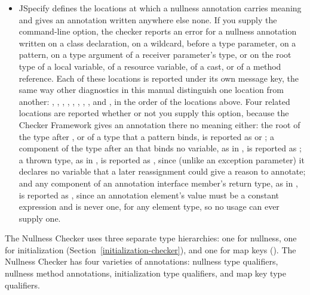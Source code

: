 \begin{enumerate}
\begin{itemize}
\item
  \label{nullness-jspecifyUnrecognizedLocations}%
  JSpecify defines the locations at which a nullness annotation carries meaning
  and gives an annotation written anywhere else none.  If you supply the
   command-line option, the checker reports
  an error for a nullness annotation written on a class declaration, on a wildcard,
  before a type parameter, on a pattern, on a type argument of a receiver parameter's
  type, or on the root type of a local variable, of a resource variable, of a cast, or
  of a method reference.  Each of these locations is reported under its own
   message key, the same way other diagnostics in
  this manual distinguish one location from another:  , ,
  , , , ,
  , , and , in the order of the
  locations above.
  Four related locations are reported whether or not you supply this option, because the
  Checker Framework gives an annotation there no meaning either:  the root of the type
  after , or of a type that a pattern binds, is reported as
   or ; a component of
  the type after an  that binds no variable, as in
  , is reported as ;
  a thrown type, as in , is reported as
  , since (unlike an exception parameter) it declares no
  variable that a later reassignment could give a reason to annotate; and any component
  of an annotation interface member's return type, as in ,
  is reported as , since an annotation element's
  value must be a constant expression and  is never one, for any element
  type, so no usage can ever supply one.
\end{itemize}

\end{enumerate}



The Nullness Checker uses three separate type hierarchies:  one for nullness,
one for initialization (Section~\ref{initialization-checker}),
and one for map keys ().
The Nullness Checker has four varieties of annotations:  nullness
type qualifiers, nullness method annotations, initialization type qualifiers, and
map key type
qualifiers.

